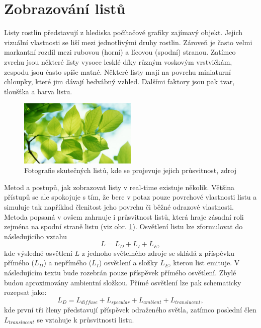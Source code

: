 \section{Zobrazování listů}
\label{sec-leafMethod}
Listy rostlin představují z hlediska počítačové grafiky zajímavý objekt. Jejich vizuální vlastnosti se liší mezi jednotlivými druhy rostlin. Zároveň je často velmi markantní rozdíl mezi rubovou (horní) a lícovou (spodní) stranou. Zatímco zvrchu jsou některé listy vysoce lesklé díky různým voskovým vrstvičkám, zespodu jsou často spíše matné. Některé listy mají na povrchu miniaturní chloupky, které jim dávají hedvábný vzhled. Dalšími faktory jsou pak tvar, tloušťka a barva listu. 
 \begin{figure}[here]
\begin{center}
\includegraphics[width=0.5\textwidth]{./figures/translucent_leaves.jpg}
\end{center}
\caption[Fotografie průsvitných listů]%
{ Fotografie skutečných listů, kde se projevuje jejich průsvitnost, zdroj \cite{TLW} \label{fig:translucentLeaves}
}

\end{figure}

Metod a postupů, jak zobrazovat listy v real-time existuje několik. Většina přístupů se ale spokojuje s tím, že bere v potaz pouze povrchové vlastnosti listu a simuluje tak například členitost jeho povrchu či běžné odrazové vlastnosti. Metoda popsaná v \cite{Habel_2007_RTT} ovšem zahrnuje i průsvitnost listů, která hraje zásadní roli zejména na spodní straně listu (viz obr. \ref{fig:translucentLeaves}). Osvětlení listu lze zformulovat do následujícího vztahu
\begin{equation}
L = L_D + L_I + L_E,
\end{equation}
kde výsledné osvětlení $L$ z jednoho světelného zdroje se skládá z příspěvku přímého ($L_D$) a nepřímého ($L_I$) osvětlení a složky $L_E$, kterou list emituje. 
V následujícím textu bude rozebrán pouze příspěvek přímého osvětlení. Zbylé budou aproximovány ambientní složkou. Přímé osvětlení lze pak schematicky rozepsat jako:
\begin{equation}
\label{eq:directLight}
L_D = L_{diffuse} + L_{specular}+ L_{ambient} + L_{translucent},
\end{equation}
kde první tři členy představují příspěvek odraženého světla, zatímco poslední člen $ L_{translucent}$ se vztahuje k průsvitnosti listu.

